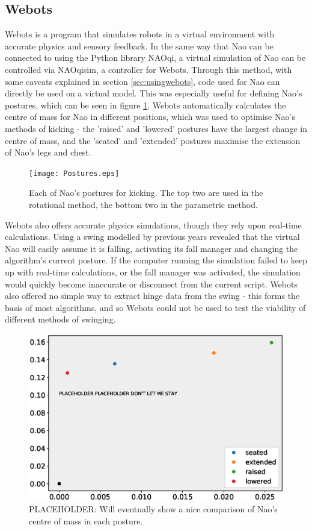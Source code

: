 \documentclass[11pt]{article}
\newcommand*\ruleline[1]{\par\noindent\raisebox{.8ex}{\makebox[\linewidth]{\hrulefill\hspace{1ex}\raisebox{-.8ex}{#1}\hspace{1ex}\hrulefill}}}
\begin{document}
\subsection{Webots} \label{sec:webots}
\ruleline{James Doering}
Webots is a program that simulates robots in a virtual environment with accurate physics and sensory feedback. In the same way that Nao can be connected to using the Python library NAOqi, a virtual simulation of Nao can be controlled via NAOqisim, a controller for Webots. Through this method, with some caveats explained in section \ref{sec:usingwebots}, code used for Nao can directly be used on a virtual model. This was especially useful for defining Nao's postures, which can be seen in figure \ref{fig:postures}. Webots automatically calculates the centre of mass for Nao in different positions, which was used to optimise Nao's methods of kicking - the 'raised' and 'lowered' postures have the largest change in centre of mass, and the 'seated' and 'extended' postures maximise the extension of Nao's legs and chest. \\

\begin{figure}
    \centering
    \texttt{[image: Postures.eps]}
    \caption{Each of Nao's postures for kicking. The top two are used in the rotational method, the bottom two in the parametric method.}
    \label{fig:postures}
\end{figure}

Webots also offers accurate physics simulations, though they rely upon real-time calculations. Using a swing modelled by previous years revealed that the virtual Nao will easily assume it is falling, activating its fall manager and changing the algorithm's current posture. If the computer running the simulation failed to keep up with real-time calculations, or the fall manager was activated, the simulation would quickly become inaccurate or disconnect from the current script. Webots also offered no simple way to extract hinge data from the swing - this forms the basis of most algorithms, and so Webots could not be used to test the viability of different methods of swinging.


\begin{figure}
    \centering
    \includegraphics[width=0.65\linewidth]{COMPLACEHOLDER.eps}
    \caption{PLACEHOLDER: Will eventually show a nice comparison of Nao's centre of mass in each posture.}
    \label{fig:centreofmasses}
\end{figure}
\end{document}
